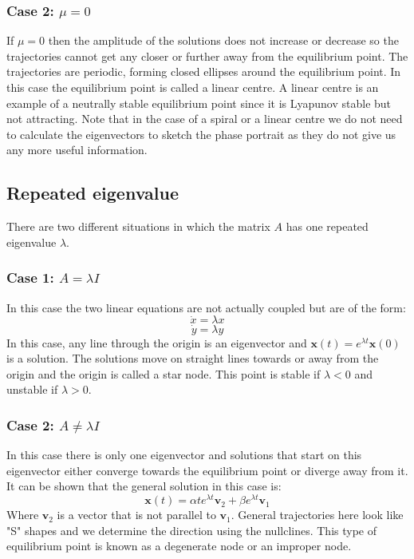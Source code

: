 \documentclass[12pt]{article}
\begin{document}
\subsubsection*{Case 2: \(\mu=0\)}
If \(\mu=0\) then the amplitude of the solutions does not increase or decrease so the trajectories cannot get any closer or further away from the equilibrium point. The trajectories are periodic, forming closed ellipses around the equilibrium point. In this case the equilibrium point is called a linear centre. A linear centre is an example of a neutrally stable equilibrium point since it is Lyapunov stable but not attracting. Note that in the case of a spiral or a linear centre we do not need to calculate the eigenvectors to sketch the phase portrait as they do not give us any more useful information.
\subsection*{Repeated eigenvalue}
There are two different situations in which the matrix \(A\) has one repeated eigenvalue \(\lambda\).
\subsubsection*{Case 1: \(A=\lambda I\)}
In this case the two linear equations are not actually coupled but are of the form:
\[\dot{x}=\lambda x\]
\[\dot{y}=\lambda y\]
In this case, any line through the origin is an eigenvector and \(\textbf{x}(t)=e^{\lambda t}\textbf{x}(0)\) is a solution. The solutions move on straight lines towards or away from the origin and the origin is called a star node. This point is stable if \(\lambda <0\) and unstable if \(\lambda>0\).
\subsubsection*{Case 2: \(A\ne\lambda I\)}
In this case there is only one eigenvector and solutions that start on this eigenvector either converge towards the equilibrium point or diverge away from it. It can be shown that the general solution in this case is:
\[\textbf{x}(t)=\alpha te^{\lambda t}\textbf{v}_2+\beta e^{\lambda t}\textbf{v}_1\]
Where \(\textbf{v}_2\) is a vector that is not parallel to \(\textbf{v}_1\). General trajectories here look like "S" shapes and we determine the direction using the nullclines. This type of equilibrium point is known as a degenerate node or an improper node.
\end{document}
